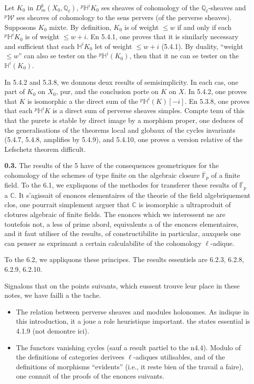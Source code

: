 \documentclass[12pt,a4paper]{article}
\theoremstyle{plain}
\theoremstyle{definition}
\theoremstyle{remark}
\newcommand{\HH}{\mathbb{H}}
\newcommand{\CC}{\mathbb{C}}
\newcommand{\QQ}{\mathbb{Q}}
\newcommand{\FF}{\mathbb{F}}
\begin{document}
Let $K_{0}$ in $D^{b}_{m}(X_{0}, \QQ_{\ell})$, ${}^{p}\HH^{i}K_{0}$ ses sheaves of cohomology of the $\QQ_{\ell}$-sheaves and ${}^{p}\mathcal{W}$ ses sheaves of cohomology to the sens pervers (of the perverse sheaves). Supposons $K_{0}$ mixte. By definition, $K_{0}$ is of weight $\leq w$ if and only if each ${}^{p}\HH^{i}K_{0}$ is of weight $\leq w{+}i$. En 5.4.1, one proves that it is similarly necessary and sufficient that each $\HH^{i}K_{0}$ let of weight $\leq w{+}i$ (5.4.1). By duality, ``weight $\leq w$'' can also se tester on the ${}^{p}\HH^{i}(K_{0})$, then that it ne can se tester on the $\HH^{i}(K_{0})$.

In 5.4.2 and 5.3.8, we donnons deux results of semisimplicity. In each cas, one part of $K_{0}$ on $X_{0}$, pur, and the conclusion porte on $K$ on $X$. In 5.4.2, one proves that $K$ is isomorphic a the direct sum of the ${}^{p}\HH^{i}(K)[-i]$. En 5.3.8, one proves that each ${}^{p}\HH^{i}K$ is a direct sum of perverse sheaves simples. Compte tenu of this that the purete is stable by direct image by a morphism proper, one deduces of the generalisations of the theorems local and globaux of the cycles invariants (5.4.7, 5.4.8, amplifies by 5.4.9), and 5.4.10, one proves a version relative of the Lefschetz theorem difficult.

\medskip

\noindent
\textbf{0.3.} The results of the 5 have of the consequences geometriques for the cohomology of the schemes of type finite on the algebraic closure $\overline{\FF}_{p}$ of a finite field. To the 6.1, we expliquons of the methodes for transferer these results of $\overline{\FF}_{p}$ a $\CC$. It s'agissait of enonces elementaires of the theorie of the field algebriquement clos, one pourrait simplement arguer that $\CC$ is isomorphic a ultraproduit of clotures algebraic of finite fields. The enonces which we interessent ne are toutefois not, a less of prime abord, equivalents a of the enonces elementaires, and it faut utiliser of the results, of constructibilite in particular, auxquels one can penser as exprimant a certain calculabilite of the cohomology $\ell$-adique.

To the 6.2, we appliquons these principes. The results essentiels are 6.2.3, 6.2.8, 6.2.9, 6.2.10.

Signalons that on the points suivants, which eussent trouve leur place in these notes, we have failli a the tache.

\begin{itemize}
\item The relation between perverse sheaves and modules holonomes. As indique in this introduction, it a joue a role heuristique important. the states essential is 4.1.9 (not demontre ici).
\item The functors vanishing cycles (sauf a result partiel to the n4.4). Modulo of the definitions of categories derivees $\ell$-adiques utilisables, and of the definitions of morphisms ``evidents'' (i.e., it reste bien of the travail a faire), one connait of the proofs of the enonces suivants.
\end{itemize}
\end{document}
